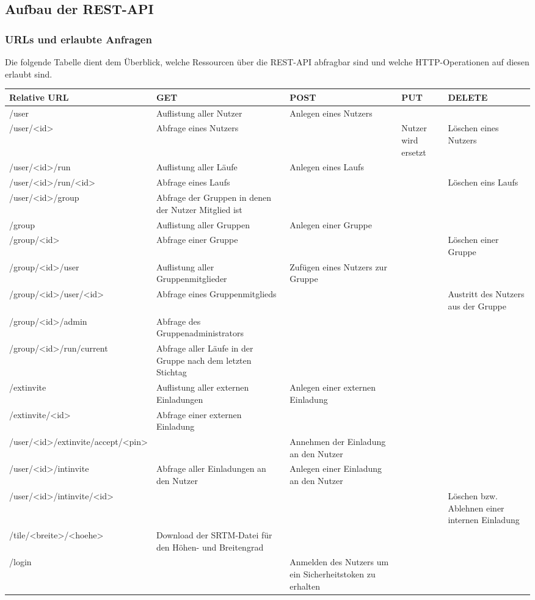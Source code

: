 \subsection{Aufbau der REST-API}
\subsubsection{URLs und erlaubte Anfragen}
Die folgende Tabelle dient dem Überblick, welche Ressourcen über die REST-API abfragbar sind und welche HTTP-Operationen auf diesen erlaubt sind.
\begin{center}
\begin{longtable}{| p{4.1cm} | p{2cm} | p{2cm} | p{2cm} | p{2cm} |}
\hline
Relative URL  & GET & POST & PUT & DELETE \\ 
\hline \hline
/user & Auflistung aller Nutzer & Anlegen eines Nutzers &  & \\
\hline
/user/<id> & Abfrage eines Nutzers & & Nutzer wird ersetzt & Löschen eines Nutzers \\
\hline
/user/<id>/run & Auflistung aller Läufe & Anlegen eines Laufs & & \\
\hline
/user/<id>/\-run/<id> & Abfrage eines Laufs & & & Löschen eins Laufs \\
\hline
/user/<id>/group & Abfrage der Gruppen in denen der Nutzer Mitglied ist & & & \\
\hline
/group & Auflistung aller Gruppen & Anlegen einer Gruppe & & \\
\hline
/group/<id> & Abfrage einer Gruppe & & & Löschen einer Gruppe \\
\hline
/group/<id>/user & Auflistung aller Gruppenmitglieder & Zufügen eines Nutzers zur Gruppe & & \\
\hline
/group/<id>/\-user/<id> & Abfrage eines Gruppenmitglieds & & & Austritt des Nutzers aus der Gruppe \\
\hline
/group/<id>/admin & Abfrage des Gruppenadministrators & & & \\
\hline
/group/<id>/\-run/current & Abfrage aller Läufe in der Gruppe nach dem letzten Stichtag & & & \\
\hline
/extinvite & Auflistung aller externen Einladungen & Anlegen einer externen Einladung & & \\
\hline
/extinvite/<id> & Abfrage einer externen Einladung & & & \\
\hline
/user/<id>/\-extinvite/accept/<pin> & & Annehmen der Einladung an den Nutzer & & \\
\hline
/user/<id>/intinvite & Abfrage aller Einladungen an den Nutzer & Anlegen einer Einladung an den Nutzer & & \\
\hline
/user/<id>/\-intinvite/<id> & & & & Löschen bzw. Ablehnen einer internen Einladung \\
\hline
/tile/<breite>/<hoehe> & Download der SRTM-Datei für den Höhen- und Breitengrad & & & \\
\hline
/login & & Anmelden des Nutzers um ein Sicherheitstoken zu erhalten & & \\
\hline
\end{longtable}
\end{center}

